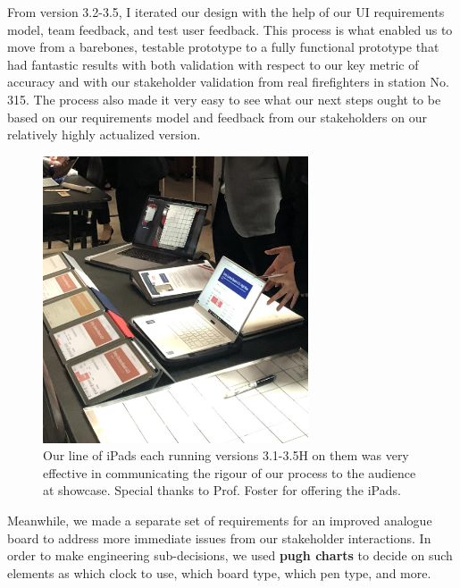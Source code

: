 \documentclass[a4paper,12pt]{article}
\begin{document}
From version 3.2-3.5, I iterated our design with the help of our UI requirements model, team feedback, and test user feedback. This process is what enabled us to move from a barebones, testable prototype to a fully functional prototype that had fantastic results with both validation with respect to our key metric of accuracy and with our stakeholder validation from real firefighters in station No. 315. The process also made it very easy to see what our next steps ought to be based on our requirements model and feedback from our stakeholders on our relatively highly actualized version.

\begin{figure}[H]
\centering
\includegraphics[width=0.7\textwidth]{img/image019.png}
\caption{Our line of iPads each running versions 3.1-3.5H on them was very effective in communicating the rigour of our process to the audience at showcase. Special thanks to Prof. Foster for offering the iPads.}
\label{}
\end{figure}

Meanwhile, we made a separate set of requirements for an improved analogue board to address more immediate issues from our stakeholder interactions. In order to make engineering sub-decisions, we used \textbf{pugh charts} to decide on such elements as which clock to use, which board type, which pen type, and more.
\end{document}
